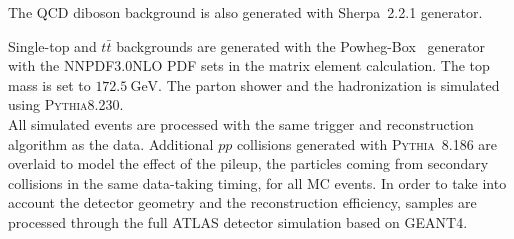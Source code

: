 The QCD diboson background is also generated with Sherpa~2.2.1 generator.

Single-top and $t\bar{t}$ backgrounds are generated with the Powheg-Box~\cite{Alioli:2010xd} generator with the NNPDF3.0NLO PDF\cite{Ball:2014uwa} sets in the matrix element calculation. The top mass is set to $172.5~\mathrm{GeV}$. The parton shower and the hadronization is simulated using \textsc{Pythia}8.230. \\

All simulated events are processed with the same trigger and reconstruction algorithm as the data.
Additional $pp$ collisions generated with \textsc{Pythia}~8.186\cite{Sjostrand:2008vc} are overlaid to model the effect of the pileup, the particles coming from secondary collisions in the same data-taking timing, for all MC events.
In order to take into account the detector geometry and the reconstruction efficiency, samples are processed through the full ATLAS detector simulation\cite{SOFT-2010-01} based on \textsc{GEANT4}\cite{Agostinelli:2002hh}.



